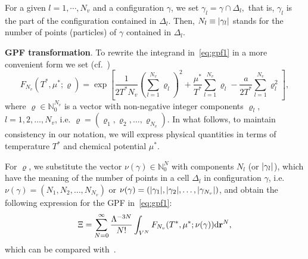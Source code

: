 \documentclass[12pt]{article}
\numberwithin{equation}{section}
\begin{document}
	For a given $l = 1, \cdots , N_v$ and a configuration $\gamma$, we set $\gamma_l = \gamma \cap \Delta_l,$ that is, $\gamma_l$ is the part of the configuration contained in $\Delta_l$. Then, $N_l \equiv \abs{\gamma_l}$ stands for the number of points (particles) of $\gamma$ contained in $\Delta_l$.
	
	\textbf{GPF transformation}. To rewrite the integrand in~\eqref{eq:gpf1} in a more convenient form we set (cf.~\cite[eq.~(2.7)]{KKD20})
	\begin{equation}
		F_{N_v}(T^*, \mu^*; \varrho) = \exp[\frac{1}{2T^*N_v}\left(\sum_{l=1}^{N_v} \varrho_l\right)^2 + \frac{\mu^*}{T^*}\sum_{l=1}^{N_v} \varrho_l - \frac{a}{2T^*} \sum_{l=1}^{N_v} \varrho_l^2],
	\end{equation}
	where $\varrho \in \mathbb{N}_0^{N_v}$ is a vector with non-negative integer components $\varrho_l$, $l=1, 2, \ldots , N_v$, i.e. $\varrho = (\varrho_1, \varrho_2, \ldots, \varrho_{N_{v}})$. In what follows, to maintain consistency in our notation, we will express physical quantities in terms of temperature $T^*$ and chemical potential $\mu^*$.
	
	For $\varrho$, we substitute the vector $\nu(\gamma) \in \mathbb{N}_0^N$ with components $N_l$ (or $\abs{\gamma_l}$), which have the meaning of the number of points in a cell $\Delta_{l}$ in configuration $\gamma$, i.e. $\nu(\gamma)=(N_1, N_2, \ldots, N_{N_v})$ or $\nu(\gamma) = (\abs{\gamma_1}, \abs{\gamma_2}, \ldots, \abs{\gamma_{N_v}})$, and obtain the following expression for the GPF in~\eqref{eq:gpf1}:
	\begin{equation}
		\Xi = \sum_{N=0}^{\infty} \frac{\Lambda^{-3N}}{N!}\int_{V^N} F_{N_v}(T^*,\mu^*;\nu(\gamma)) {\rm d} \vb{r}^N,
	\end{equation}
	which can be compared with~\cite[eq.~(2.8)]{KKD20}.
	
\end{document}
